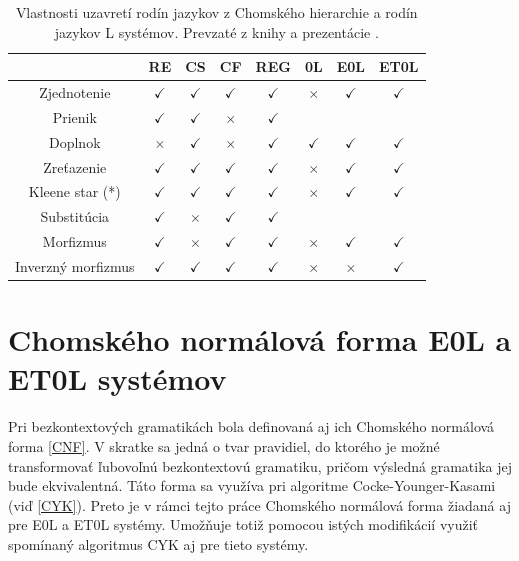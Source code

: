 \begin{table}[]
    \centering
    \begin{tabular}{|c||c|c|c|c||c|c|c|}
    \hline
        & RE & CS & CF & REG & 0L & E0L & ET0L\\
    \hline
        Zjednotenie & $\checkmark$ & $\checkmark$ & $\checkmark$ & $\checkmark$ 
        & $\times$ & $\checkmark$ & $\checkmark$ \\
    \hline
        Prienik & $\checkmark$ & $\checkmark$ & $\times$ & $\checkmark$
        &  &  &  \\
    \hline
        Doplnok & $\times$ & $\checkmark$ & $\times$ & $\checkmark$
        & $\checkmark$ & $\checkmark$ & $\checkmark$ \\
    \hline
        Zreťazenie & $\checkmark$ & $\checkmark$ & $\checkmark$ & $\checkmark$
        & $\times$ & $\checkmark$ & $\checkmark$ \\
    \hline
        Kleene star (*) & $\checkmark$ & $\checkmark$ & $\checkmark$ & $\checkmark$
        & $\times$ & $\checkmark$ & $\checkmark$ \\
    \hline
        Substitúcia & $\checkmark$ & $\times$ & $\checkmark$ & $\checkmark$
        &  &  &  \\
    \hline
        Morfizmus & $\checkmark$ & $\times$ & $\checkmark$ & $\checkmark$
        & $\times$ & $\checkmark$ & $\checkmark$ \\
    \hline
        Inverzný morfizmus & $\checkmark$ & $\checkmark$ & $\checkmark$ & $\checkmark$
        & $\times$ & $\times$ & $\checkmark$ \\
    \hline
    \end{tabular}
    \caption{Vlastnosti uzavretí rodín jazykov z Chomského hierarchie a rodín jazykov L systémov. Prevzaté z knihy \cite{handbook} a prezentácie \cite{TIDPresentation}.}
    \label{closurePropertiesTable}
\end{table}

\section{Chomského normálová forma E0L a ET0L systémov}
\label{chomskyDegradation}
Pri bezkontextových gramatikách bola definovaná aj ich Chomského normálová forma \ref{CNF}. V skratke sa jedná o tvar pravidiel, do ktorého je možné transformovať ľubovoľnú bezkontextovú gramatiku, pričom výsledná gramatika jej bude ekvivalentná. Táto forma sa využíva pri algoritme Cocke-Younger-Kasami (viď \ref{CYK}). Preto je v rámci tejto práce Chomského normálová forma žiadaná aj pre E0L a ET0L systémy. Umožňuje totiž pomocou istých modifikácií využiť spomínaný algoritmus CYK aj pre tieto systémy.

